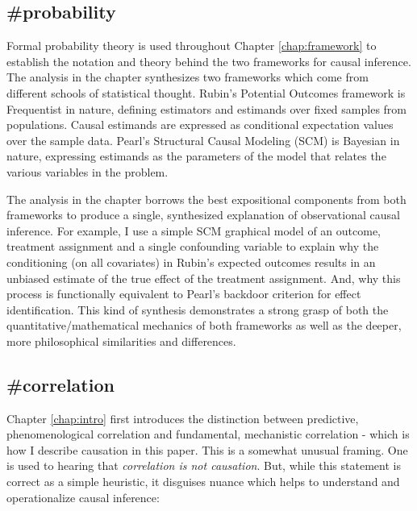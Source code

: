 \documentclass[./main.tex]{subfiles}
\begin{document}
\subsection*{\textbf{\#probability}}
\label{hc:probability}

Formal probability theory is used throughout Chapter \ref{chap:framework} to establish the notation and theory behind the two frameworks for causal inference. The analysis in the chapter synthesizes two frameworks which come from different schools of statistical thought. Rubin's Potential Outcomes framework is Frequentist in nature, defining estimators and estimands over fixed samples from populations. Causal estimands are expressed as conditional expectation values over the sample data. Pearl's Structural Causal Modeling (SCM) is Bayesian in nature, expressing estimands as the parameters of the model that relates the various variables in the problem.

\vspace{\baselineskip}

The analysis in the chapter borrows the best expositional components from both frameworks to produce a single, synthesized explanation of observational causal inference. For example, I use a simple SCM graphical model of an outcome, treatment assignment and a single confounding variable to explain why the conditioning (on all covariates) in Rubin's expected outcomes results in an unbiased estimate of the true effect of the treatment assignment. And, why this process is functionally equivalent to Pearl's backdoor criterion for effect identification. This kind of synthesis demonstrates a strong grasp of both the quantitative/mathematical mechanics of both frameworks as well as the deeper, more philosophical similarities and differences.


\subsection*{\textbf{\#correlation}}
\label{hc:correlation}

Chapter \ref{chap:intro} first introduces the distinction between predictive, phenomenological correlation and fundamental, mechanistic correlation - which is how I describe causation in this paper. This is a somewhat unusual framing. One is used to hearing that \textit{correlation is not causation}. But, while this statement is correct as a simple heuristic, it disguises nuance which helps to understand and operationalize causal inference:
\end{document}
